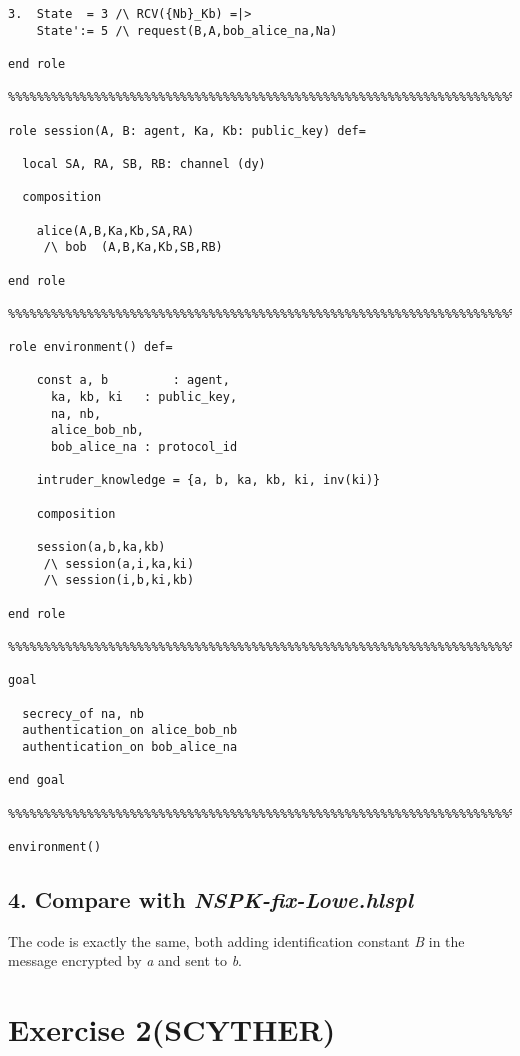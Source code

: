 \documentclass[a4paper, 12pt]{report}
\begin{document}
\begin{lstlisting}[frame=single]
    3.  State  = 3 /\ RCV({Nb}_Kb) =|> 
	State':= 5 /\ request(B,A,bob_alice_na,Na)

end role

%%%%%%%%%%%%%%%%%%%%%%%%%%%%%%%%%%%%%%%%%%%%%%%%%%%%%%%%%%%%%%%%%%%%%%%%

role session(A, B: agent, Ka, Kb: public_key) def=

  local SA, RA, SB, RB: channel (dy)

  composition 

	alice(A,B,Ka,Kb,SA,RA)
     /\ bob  (A,B,Ka,Kb,SB,RB)

end role

%%%%%%%%%%%%%%%%%%%%%%%%%%%%%%%%%%%%%%%%%%%%%%%%%%%%%%%%%%%%%%%%%%%%%%%%

role environment() def=

    const a, b	       : agent,
	  ka, kb, ki   : public_key,
	  na, nb,
	  alice_bob_nb,
	  bob_alice_na : protocol_id

    intruder_knowledge = {a, b, ka, kb, ki, inv(ki)}

    composition

	session(a,b,ka,kb)
     /\ session(a,i,ka,ki)
     /\ session(i,b,ki,kb)

end role

%%%%%%%%%%%%%%%%%%%%%%%%%%%%%%%%%%%%%%%%%%%%%%%%%%%%%%%%%%%%%%%%%%%%%%%%

goal

  secrecy_of na, nb
  authentication_on alice_bob_nb
  authentication_on bob_alice_na

end goal

%%%%%%%%%%%%%%%%%%%%%%%%%%%%%%%%%%%%%%%%%%%%%%%%%%%%%%%%%%%%%%%%%%%%%%%%

environment()
        \end{lstlisting}
    \section*{4. Compare with \emph{NSPK-fix-Lowe.hlspl}}
    The code is exactly the same, both adding identification constant \emph{B} in the message encrypted by \emph{a} and sent to \emph{b}.
            
\chapter* {Exercise 2(SCYTHER)}
%
\end{document}
